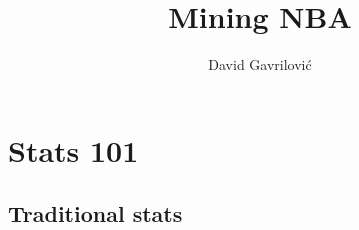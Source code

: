 \documentclass[a4paper]{article}
\begin{document}
\title{Mining NBA}
\author{David Gavrilović}
\maketitle
\thispagestyle{empty}

\newpage

\tableofcontents
\thispagestyle{empty}

\newpage

\section{Stats 101}
\label{sec:stats_101}


\subsection{Traditional stats}
\label{subsec:traditional_stats}
\end{document}

